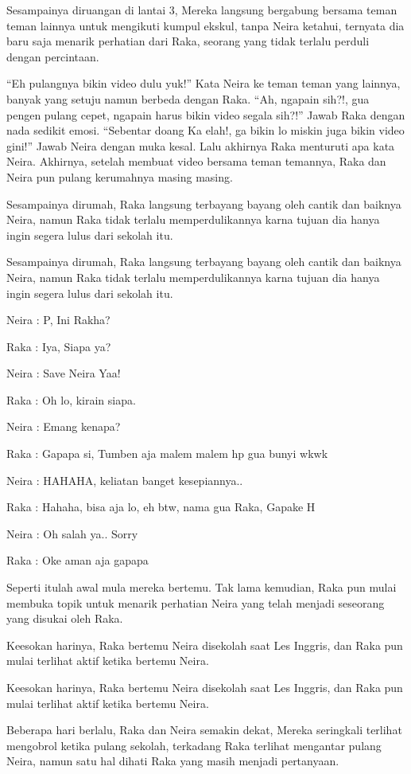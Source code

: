 Sesampainya diruangan di lantai 3, Mereka langsung bergabung bersama teman teman lainnya untuk mengikuti kumpul ekskul, tanpa Neira ketahui, ternyata dia baru saja menarik perhatian dari Raka, seorang yang tidak terlalu perduli dengan percintaan.


``Eh pulangnya bikin video dulu yuk!'' Kata Neira ke teman teman yang lainnya, banyak yang setuju namun berbeda dengan Raka. ``Ah, ngapain sih?!, gua pengen pulang cepet, ngapain harus bikin video segala sih?!'' Jawab Raka dengan nada sedikit emosi. ``Sebentar doang Ka elah!, ga bikin lo miskin juga bikin video gini!'' Jawab Neira dengan muka kesal. Lalu akhirnya Raka menturuti apa kata Neira. Akhirnya, setelah membuat video bersama teman temannya, Raka dan Neira pun pulang kerumahnya masing masing.


Sesampainya dirumah, Raka langsung terbayang bayang oleh cantik dan baiknya Neira, namun Raka tidak terlalu memperdulikannya karna tujuan dia hanya ingin segera lulus dari sekolah itu.


Sesampainya dirumah, Raka langsung terbayang bayang oleh cantik dan baiknya Neira, namun Raka tidak terlalu memperdulikannya karna tujuan dia hanya ingin segera lulus dari sekolah itu.


Neira : P, Ini Rakha?


Raka : Iya, Siapa ya?


Neira : Save Neira Yaa!


Raka : Oh lo, kirain siapa.


Neira : Emang kenapa?


Raka : Gapapa si, Tumben aja malem malem hp gua bunyi wkwk


Neira : HAHAHA, keliatan banget kesepiannya..


Raka : Hahaha, bisa aja lo, eh btw, nama gua Raka, Gapake H


Neira : Oh salah ya.. Sorry


Raka : Oke aman aja gapapa


Seperti itulah awal mula mereka bertemu. Tak lama kemudian, Raka pun mulai membuka topik untuk menarik perhatian Neira yang telah menjadi seseorang yang disukai oleh Raka.


Keesokan harinya, Raka bertemu Neira disekolah saat Les Inggris, dan Raka pun mulai terlihat aktif ketika bertemu Neira.


Keesokan harinya, Raka bertemu Neira disekolah saat Les Inggris, dan Raka pun mulai terlihat aktif ketika bertemu Neira.


Beberapa hari berlalu, Raka dan Neira semakin dekat, Mereka seringkali terlihat mengobrol ketika pulang sekolah, terkadang Raka terlihat mengantar pulang Neira, namun satu hal dihati Raka yang masih menjadi pertanyaan.


